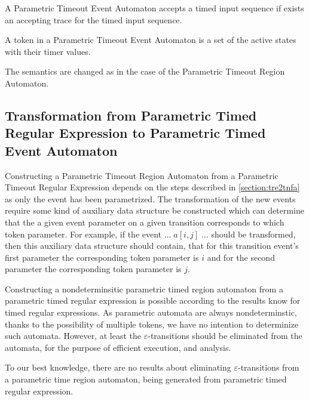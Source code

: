 		\begin{dfn}
			\label{dfn:cep:ptea:accepting}
			A Parametric Timeout Event Automaton accepts a timed input sequence if exists an accepting trace for the timed input sequence.
		\end{dfn}
		
		\begin{dfn}
			\label{dfn:cep:ptea:token}
			A token in a Parametric Timeout Event Automaton is a set of the active states with their timer values.
		\end{dfn}
		
		The semantics are changed as in the case of the Parametric Timeout Region Automaton.
		
		\subsection{Transformation from Parametric Timed Regular Expression to Parametric Timed Event Automaton}
		\label{section:ptre2tnfa}	
			
		Constructing a Parametric Timeout Region Automaton from a Parametric Timeout Regular Expression depends on the steps described in \cref{section:tre2tnfa} as only the event has been parametrized. The transformation of the new events require some kind of auxiliary data structure be constructed which can determine that the a given event parameter on a given transition corresponds to which token parameter. For example, if the event $\dots \; a[i,j] \; \dots$ should be transformed, then this auxiliary data structure should contain, that for this transition event's first parameter the corresponding token parameter is $i$ and for the second parameter the corresponding token parameter is $j$. 
		
	
		Constructing a nondeterminsitic parametric timed region automaton from a parametric timed regular expression is possible according to the results know for timed regular expressions. As parametric automata are always nondeterminstic, thanks to the possibility of multiple tokens, we have no intention to determinize such automata.
		However, at least the $\varepsilon$-transitions should be eliminated from the automata, for the purpose of efficient execution, and analysis.
		
		To our best knowledge, there are no results about eliminating $\varepsilon$-transitions from a parametric time region automaton, being generated from parametric timed regular expression.
		